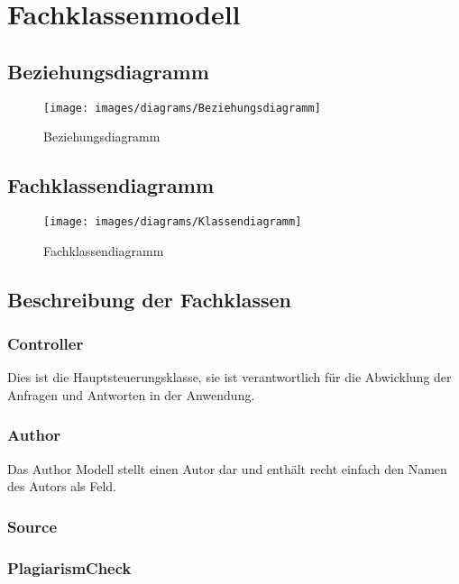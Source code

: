 \chapter{Fachklassenmodell}\label{ch:fachklassenmodell}


\section{Beziehungsdiagramm}\label{sec:beziehungsdiagramm}
\begin{figure}[H]
    \centering
    \texttt{[image: images/diagrams/Beziehungsdiagramm]}
    \caption{Beziehungsdiagramm}
    \label{fig:beziehungsdiagramm}
\end{figure}

\section{Fachklassendiagramm}\label{sec:fachklassendiagramm}
\begin{figure}[H]
    \centering
    \texttt{[image: images/diagrams/Klassendiagramm]}
    \caption{Fachklassendiagramm}
    \label{fig:fachklassendiagrammw}
\end{figure}


\section{Beschreibung der Fachklassen}\label{sec:beschreibung_der_fachklassen}

\subsection{Controller}\label{subsec:controller}
Dies ist die Hauptsteuerungsklasse,
sie ist verantwortlich für die Abwicklung der Anfragen und Antworten in der Anwendung.

\subsection{Author}\label{subsec:author}
Das Author Modell stellt einen Autor dar und enthält recht einfach den Namen des Autors als Feld.

\subsection{Source}\label{subsec:source}

\subsection{PlagiarismCheck}\label{subsec:plagiarism_check}

